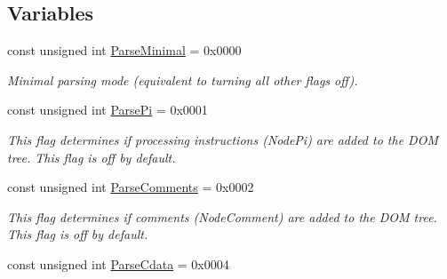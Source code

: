 \subsection*{Variables}
\begin{DoxyCompactItemize}
\item 
const unsigned int \hyperlink{namespacephys_1_1xml_ab660837afbc6aaab22425d8d23e8f2e4}{ParseMinimal} = 0x0000
\begin{DoxyCompactList}\small\item\em Minimal parsing mode (equivalent to turning all other flags off). \item\end{DoxyCompactList}\item 
\hypertarget{namespacephys_1_1xml_a4d324954fc33d50155bae04587da13e2}{
const unsigned int \hyperlink{namespacephys_1_1xml_a4d324954fc33d50155bae04587da13e2}{ParsePi} = 0x0001}
\label{d9/d27/namespacephys_1_1xml_a4d324954fc33d50155bae04587da13e2}

\begin{DoxyCompactList}\small\item\em This flag determines if processing instructions (NodePi) are added to the DOM tree. This flag is off by default. \item\end{DoxyCompactList}\item 
\hypertarget{namespacephys_1_1xml_a83ba30a7bee5a0fd4aa2f6136c8793fc}{
const unsigned int \hyperlink{namespacephys_1_1xml_a83ba30a7bee5a0fd4aa2f6136c8793fc}{ParseComments} = 0x0002}
\label{d9/d27/namespacephys_1_1xml_a83ba30a7bee5a0fd4aa2f6136c8793fc}

\begin{DoxyCompactList}\small\item\em This flag determines if comments (NodeComment) are added to the DOM tree. This flag is off by default. \item\end{DoxyCompactList}\item 
\hypertarget{namespacephys_1_1xml_aec00a2a16700dfd76f8f3c776bd000ac}{
const unsigned int \hyperlink{namespacephys_1_1xml_aec00a2a16700dfd76f8f3c776bd000ac}{ParseCdata} = 0x0004}
\label{d9/d27/namespacephys_1_1xml_aec00a2a16700dfd76f8f3c776bd000ac}


\end{DoxyCompactItemize}
